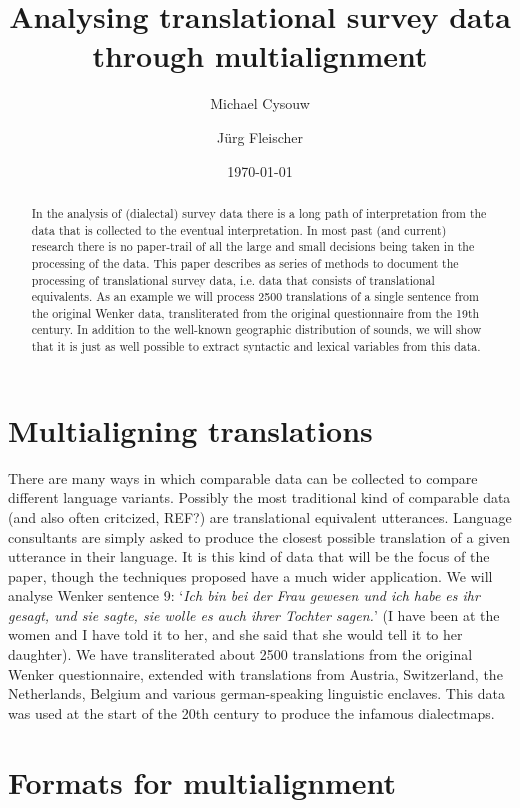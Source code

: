 \documentclass[11pt]{article}
\title{Analysing translational survey data through multialignment}
\author{Michael Cysouw \and Jürg Fleischer}
\date{\today}
\begin{document}
  
\maketitle
  
\begin{abstract}
In the analysis of (dialectal) survey data there is a long path of interpretation from the data that is collected to the eventual interpretation. In most past (and current) research there is no paper-trail of all the large and small decisions being taken in the processing of the data. This paper describes as series of methods to document the processing of translational survey data, i.e. data that consists of translational equivalents. As an example we will process 2500 translations of a single sentence from the original Wenker data, transliterated from the original questionnaire from the 19th century. In addition to the well-known geographic distribution of sounds, we will show that it is just as well possible to extract syntactic and lexical variables from this data.
\end{abstract}

\section{Multialigning translations}

There are many ways in which comparable data can be collected to compare different language variants. Possibly the most traditional kind of comparable data (and also often critcized, REF?) are translational equivalent utterances. Language consultants are simply asked to produce the closest possible translation of a given utterance in their language. It is this kind of data that will be the focus of the paper, though the techniques proposed have a much wider application. We will analyse Wenker sentence 9: `\textit{Ich bin bei der Frau gewesen und ich habe es ihr gesagt, und sie sagte, sie wolle es auch ihrer Tochter sagen.}' (I have been at the women and I have told it to her, and she said that she would tell it to her daughter). We have transliterated about 2500 translations from the original Wenker questionnaire, extended with translations from Austria, Switzerland, the Netherlands, Belgium and various german-speaking linguistic enclaves. This data was used at the start of the 20th century to produce the infamous dialectmaps.

\section{Formats for multialignment}
\end{document}
